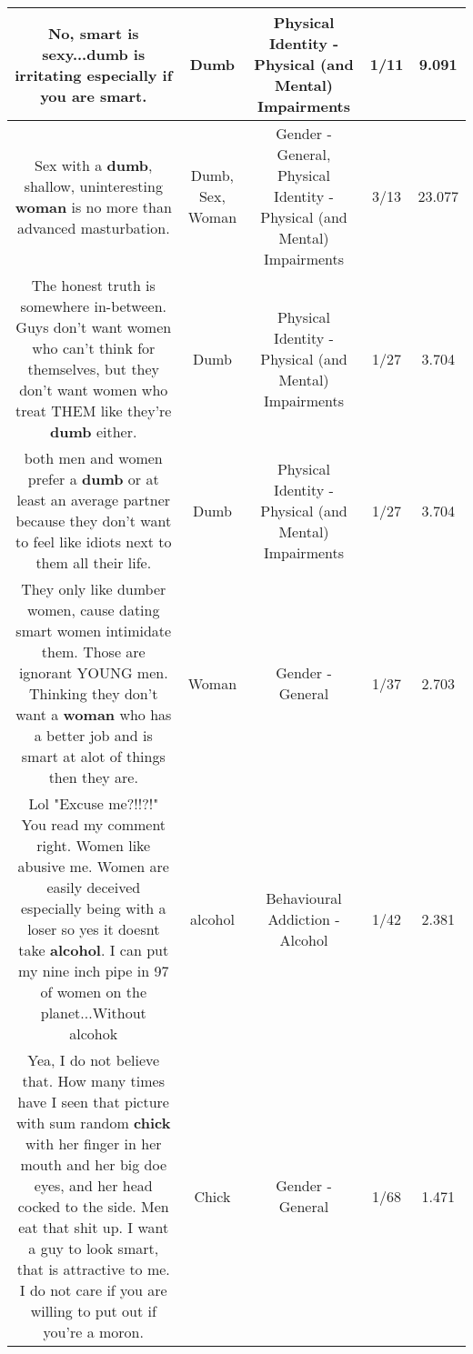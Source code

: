 \documentclass[11pt]{article}
\newlength\mylength
\begin{document}
\begin{center}
\begin{longtable}{|C{.65\mylength}|C{.30\mylength}|C{.12\mylength}|C{.12\mylength}|C{.12\mylength}|}
  \small No, smart is sexy...\textbf{dumb} is irritating especially if you are smart.\normalsize   & Dumb & Physical Identity - Physical (and Mental) Impairments & 1/11 & 9.091 \\  \hline
  \small Sex with a \textbf{dumb}, shallow, uninteresting \textbf{woman} is no more than advanced masturbation.\normalsize   & Dumb, Sex, Woman & Gender - General, Physical Identity - Physical (and Mental) Impairments & 3/13 & 23.077 \\  \hline
  \small The honest truth is somewhere in-between. Guys don't want women who can't think for themselves, but they don't want women who treat THEM like they're \textbf{dumb} either.\normalsize   & Dumb & Physical Identity - Physical (and Mental) Impairments & 1/27 & 3.704 \\  \hline
  \small both men and women prefer a \textbf{dumb} or at least an average partner because they don't want to feel like idiots next to them all their life.\normalsize   & Dumb & Physical Identity - Physical (and Mental) Impairments & 1/27 & 3.704 \\  \hline
  \small They only like dumber women, cause dating smart women intimidate them. Those are ignorant YOUNG men. Thinking they don't want a \textbf{woman} who has a better job and is smart at alot of things then they are.\normalsize   & Woman & Gender - General & 1/37 & 2.703 \\  \hline
  \small Lol "Excuse me?!!?!" You read my comment right. Women like abusive me. Women are easily deceived especially being with a loser so yes it doesnt take \textbf{alcohol}. I can put my nine inch pipe in 97 of women on the planet...Without alcohok\normalsize   & alcohol & Behavioural Addiction - Alcohol & 1/42 & 2.381 \\  \hline
  \small Yea, I do not believe that. How many times have I seen that picture with sum random \textbf{chick} with her finger in her mouth and her big doe eyes, and her head cocked to the side. Men eat that shit up. I want a guy to look smart, that is attractive to me. I do not care if you are willing to put out if you're a moron.\normalsize   & Chick & Gender - General & 1/68 & 1.471 \\  \hline

\end{longtable}
\end{center}
\end{document}
